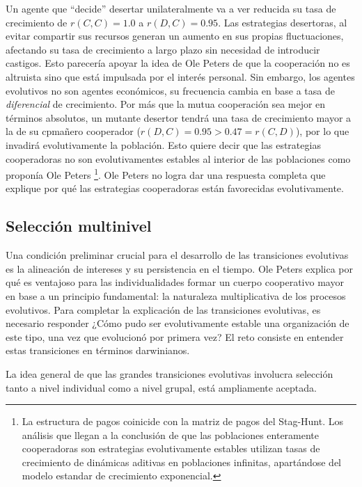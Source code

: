 \documentclass[a4paper,10pt]{article}
\begin{document}
Un agente que ``decide'' desertar unilateralmente va a ver reducida su tasa de crecimiento de $r(C,C) = 1.0$ a $ r(D,C) = 0.95$.
Las estrategias desertoras, al evitar compartir sus recursos generan un aumento en sus propias fluctuaciones, afectando su tasa de crecimiento a largo plazo sin necesidad de introducir castigos.
Esto parecería apoyar la idea de Ole Peters de que la cooperación no es altruista sino que está impulsada por el interés personal.
Sin embargo, los agentes evolutivos no son agentes económicos, su frecuencia cambia en base a tasa de \emph{diferencial} de crecimiento.
Por más que la mutua cooperación sea mejor en términos absolutos, un mutante desertor tendrá una tasa de crecimiento mayor a la de su cpmañero cooperador ($r(D,C) = 0.95 > 0.47 = r(C,D)$), por lo que invadirá evolutivamente la población. 
Esto quiere decir que las estrategias cooperadoras no son evolutivamentes estables al interior de las poblaciones como proponía Ole Peters \footnote{La estructura de pagos coinicide con la matriz de pagos del Stag-Hunt. Los análisis que llegan a la conclusión de que las poblaciones enteramente cooperadoras son estrategias evolutivamente estables utilizan tasas de crecimiento de dinámicas aditivas en poblaciones infinitas, apartándose del modelo estandar de crecimiento exponencial.}.
Ole Peters no logra dar una respuesta completa que explique por qué las estrategias cooperadoras están favorecidas evolutivamente.

\subsection{Selección multinivel}

Una condición preliminar crucial para el desarrollo de las transiciones evolutivas es la alineación de intereses y su persistencia en el tiempo.
Ole Peters explica por qué es ventajoso para las individualidades formar un cuerpo cooperativo mayor en base a un principio fundamental: la naturaleza multiplicativa de los procesos evolutivos.
Para completar la explicación de las transiciones evolutivas, es necesario responder ¿Cómo pudo ser evolutivamente estable una organización de este tipo, una vez que evolucionó por primera vez?
El reto consiste en entender estas transiciones en términos darwinianos.


La idea general de que las grandes transiciones evolutivas involucra selección tanto a nivel individual como a nivel grupal, está ampliamente aceptada.
\end{document}
